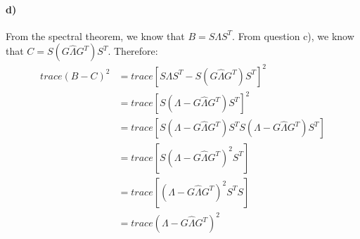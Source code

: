 \documentclass{article}
\begin{document}
\paragraph{d)} From the spectral theorem, we know that $B = S \Lambda S^T$. From question c), we know that $C = S(G \hat{\Lambda} G^T)S^T$. Therefore:
\begin{align*}
trace(B-C)^2 &= trace[S \Lambda S^T - S(G \hat{\Lambda} G^T)S^T]^2 \\
&= trace[S (\Lambda- G \hat{\Lambda} G^T)S^T]^2 \\
&= trace[S (\Lambda- G \hat{\Lambda} G^T)S^T S (\Lambda- G \hat{\Lambda} G^T)S^T] \\
&= trace[S (\Lambda- G \hat{\Lambda} G^T)^2 S^T] \\
&= trace[(\Lambda- G \hat{\Lambda} G^T)^2 S^T S]\\
&= trace(\Lambda- G \hat{\Lambda} G^T)^2
\end{align*}
\end{document}
